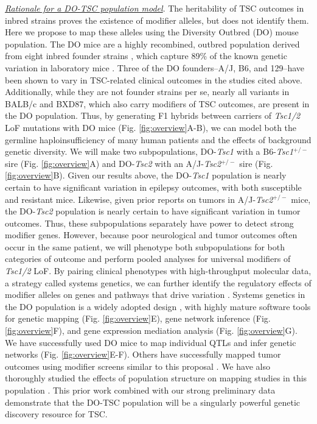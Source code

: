 \documentclass[
  12pt,
]{article}
\begin{document}
\textit{\underline{Rationale for a DO-TSC population model}}. The
heritability of TSC outcomes in inbred strains proves the existence of
modifier alleles, but does not identify them. Here we propose to map
these alleles using the Diversity Outbred (DO) mouse population. The DO
mice are a highly recombined, outbred population derived from eight
inbred founder strains \cite{22892839}, which capture 89\% of the known
genetic variation in laboratory mice \cite{17674098}. Three of the DO
founders--A/J, B6, and 129--have been shown to vary in TSC-related
clinical outcomes in the studies cited above. Additionally, while they
are not founder strains per se, nearly all variants in BALB/c and BXD87,
which also carry modifiers of TSC outcomes, are present in the DO
population. Thus, by generating F1 hybrids between carriers of
\textit{Tsc1/2} LoF mutations with DO mice (Fig. \ref{fig:overview}A-B),
we can model both the germline haploinsufficiency of many human patients
and the effects of background genetic diversity. We will make two
subpopulations, DO-\textit{Tsc1} with a B6-\textit{Tsc1}\(^{+/-}\) sire
(Fig. \ref{fig:overview}A) and DO-\textit{Tsc2} with an
A/J-\textit{Tsc2}\(^{+/-}\) sire (Fig. \ref{fig:overview}B). Given our
results above, the DO-\textit{Tsc1} population is nearly certain to have
significant variation in epilepsy outcomes, with both susceptible and
resistant mice. Likewise, given prior reports on tumors in
A/J-\textit{Tsc2}\(^{+/-}\) mice, the DO-\textit{Tsc2} population is
nearly certain to have significant variation in tumor outcomes. Thus,
these subpopulations separately have power to detect strong modifier
genes. However, because poor neurological and tumor outcomes often occur
in the same patient, we will phenotype both subpopulations for both
categories of outcome and perform pooled analyses for universal
modifiers of \textit{Tsc1/2} LoF. By pairing clinical phenotypes with
high-throughput molecular data, a strategy called systems genetics, we
can further identify the regulatory effects of modifier alleles on genes
and pathways that drive variation \cite{24296534}. Systems genetics in
the DO population is a widely adopted design
\cite{35277432, 33687326, 26614740, 27309819, 28916633, 30840070, 32467129, 32763908, 32795400, 32877673, 32917924, 33264334, 33619752, 34045313, 34324982, 34403447, 34653361, 34666007, 35383961, 35481286, 35616343, 35819478, 36028119, 36212994, 36649207, 36714272, 36788222, 36968078, 36993241, 37214876, 37082146, 37214980, 37276142, 37301941},
with highly mature software tools for genetic mapping \cite{30591514}
(Fig. \ref{fig:overview}E), gene network inference \cite{24204223} (Fig.
\ref{fig:overview}F), and gene expression mediation analysis
\cite{35533209}(Fig. \ref{fig:overview}G). We have successfully used DO
mice to map individual QTLs and infer genetic networks
\cite{28592500, 37217254} (Fig. \ref{fig:overview}E-F). Others have
successfully mapped tumor outcomes using modifier screens similar to
this proposal \cite{27916600, 32796024}. We have also thoroughly studied
the effects of population structure on mapping studies in this
population \cite{33892506}. This prior work combined with our strong
preliminary data demonstrate that the DO-TSC population will be a
singularly powerful genetic discovery resource for TSC.
\end{document}
